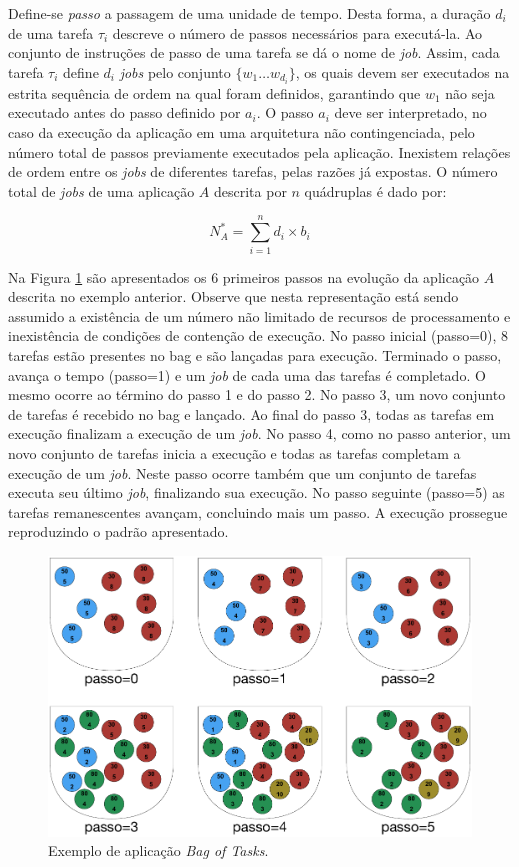 \documentclass[tese,capa]{texufpel}
\begin{document}
Define-se \emph{passo} a passagem de uma unidade de tempo. Desta forma, a duração $d_i$ de uma tarefa $\tau_i$ descreve o número de passos necessários para executá-la. Ao conjunto de instruções de passo de uma tarefa se dá o nome de \emph{job}. Assim, cada tarefa $\tau_i$ define $d_i$ \textit{jobs} pelo conjunto $\{w_1 \dots w_{d_i}\}$, os quais devem ser executados na estrita sequência de ordem na qual foram definidos, garantindo que $w_1$ não seja executado antes do passo definido por $a_i$. O passo $a_i$ deve ser interpretado, no caso da execução da aplicação em uma arquitetura não contingenciada, pelo número total de passos previamente executados pela aplicação. Inexistem relações de ordem entre os \textit{jobs} de diferentes tarefas, pelas razões já expostas. O número total de \textit{jobs} de uma aplicação $A$ descrita por $n$ quádruplas é dado por:

\[
N^*_A = \sum_{i=1}^{n}d_i \times b_i
\]

Na Figura \ref{ExemploBoT} são apresentados os 6 primeiros passos na evolução da aplicação $A$ descrita no exemplo anterior. Observe que nesta representação está sendo assumido a existência de um número não limitado de recursos de processamento e inexistência de condições de contenção de execução. No passo inicial (passo=0), 8 tarefas estão presentes no bag e são lançadas para execução. Terminado o passo, avança o tempo (passo=1) e um \textit{job} de cada uma das tarefas é completado. O mesmo ocorre ao término do passo 1 e do passo 2. No passo 3, um novo conjunto de tarefas é recebido no bag e lançado. Ao final do passo 3, todas as tarefas em execução finalizam a execução de um \textit{job}. No passo 4, como no passo anterior, um novo conjunto de tarefas inicia a execução e todas as tarefas completam a execução de um \textit{job}. Neste passo ocorre também que um conjunto de tarefas executa seu último \textit{job}, finalizando sua execução. No passo seguinte (passo=5) as tarefas remanescentes avançam, concluindo mais um passo. A execução prossegue reproduzindo o padrão apresentado.

\begin{figure}[htbp]
	\centerline{
		\includegraphics[scale=0.9]{images/BagOfTasks4.pdf}}
	\caption[Exemplo de aplicação \textit{Bag of Tasks}]{Exemplo de aplicação \textit{Bag of Tasks}.}
	\label{ExemploBoT}
\end{figure}
\end{document}

